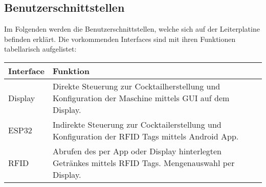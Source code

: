\clearpage
\subsection{Benutzerschnittstellen}
\label{subsec:Benutzerschnittstellen}

Im Folgenden werden die Benutzerschnittstellen, welche sich auf der Leiterplatine befinden erklärt. Die vorkommenden Interfaces sind mit ihren Funktionen tabellarisch aufgelistet:

\begin{tabularx}{\textwidth}{|l|X|}
\hline
\textbf{Interface} & \textbf{Funktion}\\
\hline
Display & Direkte Steuerung zur Cocktailherstellung und Konfiguration der Maschine mittels GUI auf dem Display. \\
\hline
ESP32 & Indirekte Steuerung zur Cocktailerstellung und Konfiguration der RFID Tags mittels Android App.\\
\hline
RFID & Abrufen des per App oder Display hinterlegten Getränkes mittels RFID Tags. Mengenauswahl per Display.\\
\hline
\end{tabularx}
